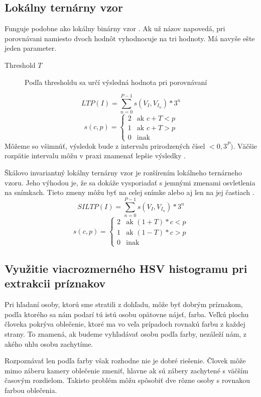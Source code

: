 \subsection{Lokálny ternárny vzor}
Funguje podobne ako lokálny binárny vzor \cite{ltp}.
Ak už názov napovedá, pri porovnávani namiesto dvoch hodnôt vyhodnocuje na tri hodnoty.
Má navyše ešte jeden parameter.
\begin{description}
\item[Threshold $T$] Podľa thresholdu sa určí výsledná hodnota pri porovnávaní
\end{description}
$$LTP(I) = \sum_{n=0}^{P-1} s(V_I, V_{I_n})*3^n $$
\[
  s(c, p) =
  \begin{cases}
    2 & \text{ak $c + T < p$} \\
	1 & \text{ak $c + T > p$} \\
	0 & \text{inak} 
  \end{cases}
\]
Môžeme so všimnúť, výsledok bude z intervalu prirodzených čísel $<0, 3^P)$.
Väčšie rozpätie intervalu môžu v praxi znamenať lepšie výsledky \cite{ltp}.

Škálovo invariantný lokálny ternárny vzor je rozšírením lokálneho ternárneho vzoru.
Jeho výhodou je, že sa dokáže vysporiadať s jemnými zmenami osvletlenia na snímkach.
Tieto zmeny môžu byť na celej snímke alebo aj len na jej častiach \cite{siltp}. 
$$SILTP(I) = \sum_{n=0}^{P-1} s(V_I, V_{I_n})*3^n $$
\[
  s(c, p) =
  \begin{cases}
    2 & \text{ak $(1 + T)*c < p$} \\
	1 & \text{ak $(1 - T)*c > p$} \\
	0 & \text{inak} 
  \end{cases}
\]

\subsection{Využitie viacrozmerného HSV histogramu pri extrakcii príznakov}
Pri hľadaní osoby, ktorú sme stratili z dohľadu, môže byť dobrým príznakom, podľa ktorého sa nám podarí tú istú osobu opätovne nájsť, farba.
Veľkú plochu človeka pokrýva oblečenie, ktoré ma vo veľa prípadoch rovnakú farbu z každej strany.
To znamená, ak budeme vyhľadávať osobu podľa farby, nezáleží nám, z akého uhlu osobu zachytíme.

Rozpoznávať len podľa farby však rozhodne nie je dobré riešenie.
Človek môže mimo záberu kamery oblečenie zmeniť, hlavne ak sú zábery zachytené s väčším časovým rozdielom.
Takisto problém môžu spôsobiť dve rôzne osoby s rovnakou farbou oblečenia.

